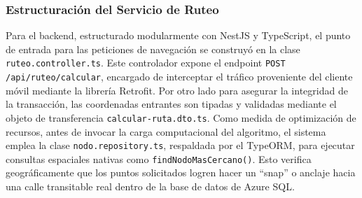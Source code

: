 \subsubsection{Estructuración del Servicio de Ruteo}

Para el backend, estructurado modularmente con NestJS y TypeScript, el punto de entrada para las peticiones de navegación se construyó en la clase \texttt{ruteo.controller.ts}. Este controlador expone el endpoint \texttt{POST /api/\allowbreak ruteo/\allowbreak calcular}, encargado de interceptar el tráfico proveniente del cliente móvil mediante la librería Retrofit. Por otro lado para asegurar la integridad de la transacción, las coordenadas entrantes son tipadas y validadas mediante el objeto de transferencia \texttt{calcular-ruta.dto.ts}. Como medida de optimización de recursos, antes de invocar la carga computacional del algoritmo, el sistema emplea la clase \texttt{nodo.repository.ts}, respaldada por el TypeORM, para ejecutar consultas espaciales nativas como \texttt{findNodoMasCercano()}. Esto verifica geográficamente que los puntos solicitados logren hacer un ``snap'' o anclaje hacia una calle transitable real dentro de la base de datos de Azure SQL.

